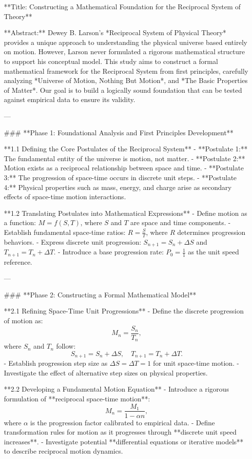 **Title: Constructing a Mathematical Foundation for the Reciprocal System of Theory**

**Abstract:**
Dewey B. Larson’s *Reciprocal System of Physical Theory* provides a unique approach to understanding the physical universe based entirely on motion. However, Larson never formulated a rigorous mathematical structure to support his conceptual model. This study aims to construct a formal mathematical framework for the Reciprocal System from first principles, carefully analyzing *Universe of Motion, Nothing But Motion*, and *The Basic Properties of Matter*. Our goal is to build a logically sound foundation that can be tested against empirical data to ensure its validity.

---

### **Phase 1: Foundational Analysis and First Principles Development**

**1.1 Defining the Core Postulates of the Reciprocal System**
- **Postulate 1:** The fundamental entity of the universe is motion, not matter.
- **Postulate 2:** Motion exists as a reciprocal relationship between space and time.
- **Postulate 3:** The progression of space-time occurs in discrete unit steps.
- **Postulate 4:** Physical properties such as mass, energy, and charge arise as secondary effects of space-time motion interactions.

**1.2 Translating Postulates into Mathematical Expressions**
- Define motion as a function: \( M = f(S, T) \), where \( S \) and \( T \) are space and time components.
- Establish fundamental space-time ratios: \( R = \frac{S}{T} \), where \( R \) determines progression behaviors.
- Express discrete unit progression: \( S_{n+1} = S_n + \Delta S \) and \( T_{n+1} = T_n + \Delta T \).
- Introduce a base progression rate: \( P_0 = \frac{1}{1} \) as the unit speed reference.

---

### **Phase 2: Constructing a Formal Mathematical Model**

**2.1 Refining Space-Time Unit Progressions**
- Define the discrete progression of motion as:
  \[
  M_n = \frac{S_n}{T_n},
  \]
  where \( S_n \) and \( T_n \) follow:
  \[
  S_{n+1} = S_n + \Delta S, \quad T_{n+1} = T_n + \Delta T.
  \]
- Establish progression step size as \( \Delta S = \Delta T = 1 \) for unit space-time motion.
- Investigate the effect of alternative step sizes on physical properties.

**2.2 Developing a Fundamental Motion Equation**
- Introduce a rigorous formulation of **reciprocal space-time motion**:
  \[
  M_n = \frac{M_1}{1 - \alpha n},
  \]
  where \( \alpha \) is the progression factor calibrated to empirical data.
- Define transformation rules for motion as it progresses through **discrete unit speed increases**.
- Investigate potential **differential equations or iterative models** to describe reciprocal motion dynamics.

